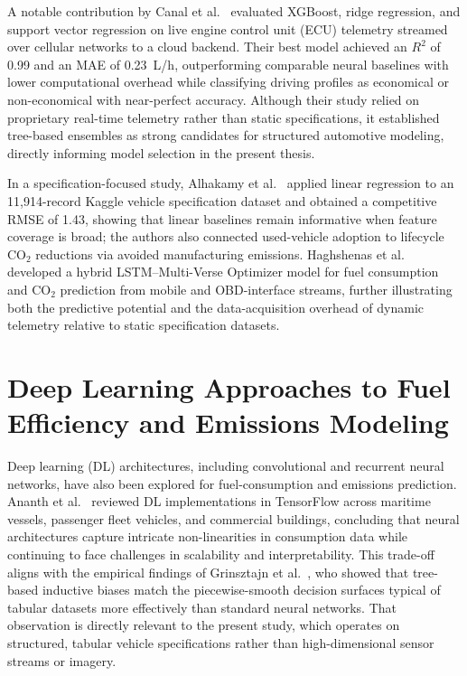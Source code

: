 A notable contribution by Canal et al.~\cite{canal2024machine} evaluated XGBoost, ridge regression, and support vector regression on live engine control unit (ECU) telemetry streamed over cellular networks to a cloud backend. Their best model achieved an $R^2$ of 0.99 and an MAE of 0.23~L/h, outperforming comparable neural baselines with lower computational overhead while classifying driving profiles as economical or non-economical with near-perfect accuracy. Although their study relied on proprietary real-time telemetry rather than static specifications, it established tree-based ensembles as strong candidates for structured automotive modeling, directly informing model selection in the present thesis.

In a specification-focused study, Alhakamy et al.~\cite{alhakamy2023used} applied linear regression to an 11,914-record Kaggle vehicle specification dataset and obtained a competitive RMSE of 1.43, showing that linear baselines remain informative when feature coverage is broad; the authors also connected used-vehicle adoption to lifecycle CO$_2$ reductions via avoided manufacturing emissions. Haghshenas et al.~\cite{haghshenas2025fuel} developed a hybrid LSTM--Multi-Verse Optimizer model for fuel consumption and CO$_2$ prediction from mobile and OBD-interface streams, further illustrating both the predictive potential and the data-acquisition overhead of dynamic telemetry relative to static specification datasets.

\section{Deep Learning Approaches to Fuel Efficiency and Emissions Modeling}

\sloppy 
Deep learning (DL) architectures, including convolutional and recurrent neural networks, have also been explored for fuel-consumption and emissions prediction. Ananth et al.~\cite{zhu2024research} reviewed DL implementations in TensorFlow across maritime vessels, passenger fleet vehicles, and commercial buildings, concluding that neural architectures capture intricate non-linearities in consumption data while continuing to face challenges in scalability and interpretability. This trade-off aligns with the empirical findings of Grinsztajn et al.~\cite{grinsztajn2022tree}, who showed that tree-based inductive biases match the piecewise-smooth decision surfaces typical of tabular datasets more effectively than standard neural networks. That observation is directly relevant to the present study, which operates on structured, tabular vehicle specifications rather than high-dimensional sensor streams or imagery.

